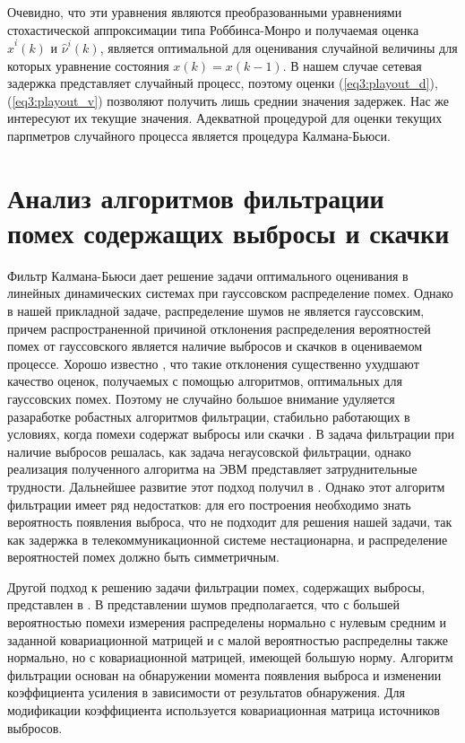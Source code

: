Очевидно, что эти уравнения являются преобразованными уравнениями стохастической аппроксимации типа Роббинса-Монро и получаемая оценка $\hat{x}^{i}(k)$ и $\hat{\nu}^{i}(k)$, является оптимальной для оценивания случайной величины для которых уравнение состояния $x(k)=x(k-1)$. 
В нашем случае сетевая задержка представляет случайный процесс, поэтому оценки (\ref{eq3:playout_d}), (\ref{eq3:playout_v}) позволяют получить лишь среднии значения задержек. 
Нас же интересуют их текущие значения. Адекватной процедурой для оценки текущих парпметров случайного процесса является процедура Калмана-Бьюси.

\section{Анализ алгоритмов фильтрации помех содержащих выбросы и скачки} \label{sect_analis_filters}

Фильтр Калмана-Бьюси дает решение задачи оптимального оценивания в линейных динамических системах при гауссовском распределение помех.
Однако в нашей прикладной задаче, распределение шумов не является гауссовским, причем распространенной причиной отклонения распределения вероятностей помех от гауссовского является наличие выбросов и скачков в оцениваемом процессе.
Хорошо известно \cite{cipkin}, что такие отклонения существенно ухудшают качество оценок, получаемых с помощью алгоритмов, оптимальных для гауссовских помех.
Поэтому не случайно большое внимание удуляется разаработке робастных алгоритмов фильтрации, стабильно работающих в условиях, когда помехи содержат выбросы или скачки \cite{Klekis, masreliez_ieee, masreliez_martin, ershov_lipcer, ershov, RobustFilter}.
В \cite{masreliez_ieee} задача фильтрации при наличие выбросов решалась, как задача   негаусовской фильтрации, однако реализация полученного алгоритма на ЭВМ представляет затруднительные трудности. 
Дальнейшее развитие этот подход получил в \cite{masreliez_martin}. Однако этот алгоритм фильтрации имеет ряд недостатков: для его построения необходимо знать вероятность появления выброса, что не подходит для решения нашей задачи, так как задержка в телекоммуникационной системе нестационарна, и распределение вероятностей помех должно быть симметричным.

Другой подход к решению задачи фильтрации помех, содержащих выбросы, представлен в \cite{ershov_lipcer, ershov}. В представлении шумов предполагается, что с большей вероятностью помехи измерения распределены нормально с нулевым средним и заданной ковариационной матрицей и с малой вероятностью распределны также нормально,  но с ковариационной матрицей, имеющей большую норму. Алгоритм фильтрации основан на обнаружении момента появления выброса и изменении коэффициента усиления в зависимости от результатов обнаружения. Для модификации коэффициента используется ковариационная матрица источников выбросов.

